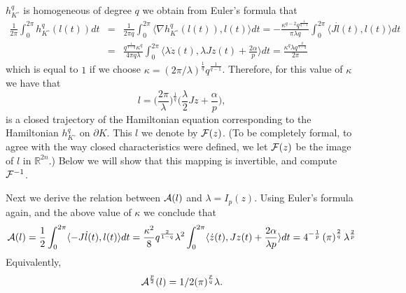 \documentclass[12pt]{article}
\def\R{{\mathbb R}}
\begin{document}
$h_{K^{\circ}}^q$ is homogeneous of degree $q$ we obtain from
Euler's formula that
\begin{eqnarray*} {\frac 1 {2 \pi}} \int_0^{2\pi} h_{K^{\circ}}^q(
 l(t))dt  & = & {\frac 1 { 2 \pi q} } \int_0^{2\pi} \langle \nabla
h_{K^{\circ}}^q(  l(t)) ,  l(t) \rangle dt = -{\frac {\kappa^{q-2}
q^{\frac 1 {q-1}} } { \pi  \lambda q} } \int_0^{2\pi} \langle J
\dot{  l}(t) , l(t) \rangle dt
\\ & = & {\frac { {{q^{ {\frac 1 {1-q}} }}} \kappa^{q}  } { 4 \pi q  \lambda}}
\int_0^{2\pi} \langle   \lambda {\dot {{z}}}(t) , \lambda J z(t) +
{\frac {2 \alpha}  p} \rangle dt = {\frac { \kappa^{q}
 \lambda q^{\frac q {1-q}}} {2 \pi   }}
\end{eqnarray*}
which is equal to $1$ if we choose $\kappa = ({ {2 \pi } / {
\lambda}})^{\frac 1 q} q^{\frac 1 {q-1}} $. Therefore, for this
value of $\kappa$ we have that
\begin{equation} \label{new_eq_for_l}  l
= \Big( {\frac {2 \pi} \lambda} \Big )^{\frac 1 q} \Big( {\frac
\lambda 2} Jz + {\frac {\alpha} p} \Big), \end{equation} is a closed
trajectory of the Hamiltonian equation  corresponding to the
Hamiltonian $h_{K^{\circ}}^q$ on $\partial K$. This $l$ we denote by
${\cal F}(z)$. (To be completely formal, to agree with the way
closed characteristics were defined, we let ${\cal F}(z)$ be the
image of $l$ in $\R^{2n}$.) Below we will show that this mapping is
invertible, and compute ${\cal F}^{-1}$.


Next we derive the relation between ${\cal A}(l)$ and $\lambda =
I_p(z)$.
 Using Euler's formula again, and the above value of $\kappa$ we
 conclude that
 $$ {\cal A} (l) = {\frac 1 2} \int_0^{2 \pi} \langle -J {\dot l}(t) ,l(t) \rangle dt =
  {\frac {\kappa^2} 8}  q^{\frac 2 {1-q}} {\lambda}^2  \int_0^{2 \pi} \langle
  {\dot z}(t) ,  J  z(t) + {\frac {2 \alpha} {\lambda p}} \rangle dt
 = {4}^{-{\frac {1} p}}
  \left ( {\pi} \right )^{\frac 2 q}  \lambda^{\frac 2 p} $$
 Equivalently,
\begin{equation}\label{lambdaval}
{\cal A}^{\frac p 2} (l) =  1/2 (\pi)^{\frac p q} \lambda.
\end{equation}
\end{document}

